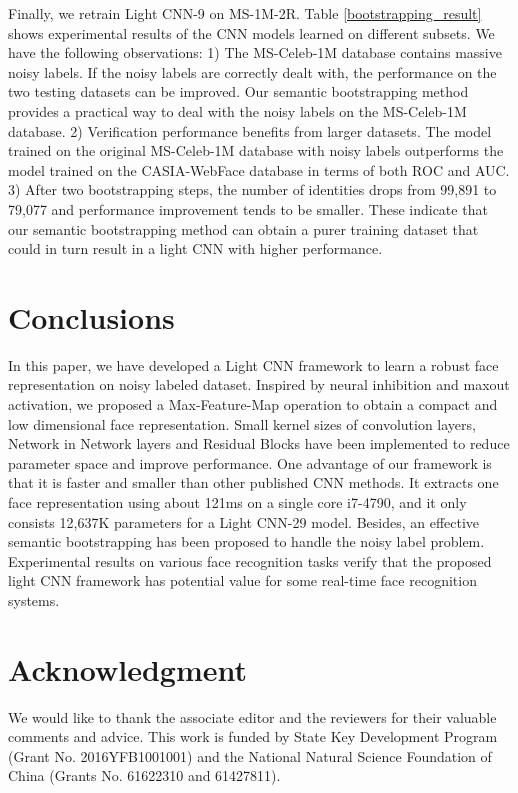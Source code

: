 \documentclass[journal,transmag]{IEEEtran}
\begin{document}
Finally, we retrain Light CNN-9 on MS-1M-2R. Table \ref{bootstrapping_result} shows experimental results of the CNN models learned on different subsets. We have the following observations: 1) The MS-Celeb-1M database contains massive noisy labels. If the noisy labels are correctly dealt with, the performance on the two testing datasets can be improved. Our semantic bootstrapping method provides a practical way to deal with the noisy labels on the MS-Celeb-1M database. 2) Verification performance benefits from larger datasets. The model trained on the original MS-Celeb-1M database with noisy labels outperforms the model trained on the CASIA-WebFace database in terms of both ROC and AUC. 3)  After two bootstrapping steps, the number of identities drops from 99,891 to 79,077 and performance improvement tends to be smaller. These indicate that our semantic bootstrapping method can obtain a purer training dataset that could in turn result in a light CNN with higher performance.

\section{Conclusions}
In this paper, we have developed a Light CNN framework to learn a robust face representation on noisy labeled dataset. Inspired by neural inhibition and maxout activation, we proposed a Max-Feature-Map operation to obtain a compact and low dimensional face representation. Small kernel sizes of convolution layers, Network in Network layers and Residual Blocks have been implemented to reduce parameter space and improve performance. One advantage of our framework is that it is faster and smaller than other published CNN methods. It extracts one face representation using about 121ms on a single core i7-4790, and it only consists 12,637K parameters for a Light CNN-29 model. Besides, an effective semantic bootstrapping has been proposed to handle the noisy label problem. Experimental results on various face recognition tasks verify that the proposed light CNN framework has potential value for some real-time face recognition systems.

\section*{Acknowledgment}

We would like to thank the associate editor and the reviewers for their valuable comments and advice. This work is funded by State Key Development Program (Grant No. 2016YFB1001001) and the National Natural Science Foundation of China (Grants No. 61622310 and 61427811).
\end{document}
